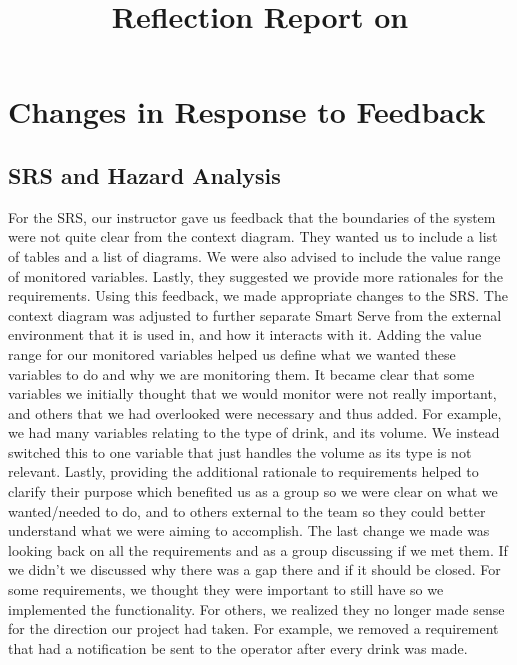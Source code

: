 \documentclass{article}
\title{Reflection Report on \progname}
\author{\authname}
\date{}
\begin{document}
\maketitle

\section{Changes in Response to Feedback}



\subsection{SRS and Hazard Analysis}
For the SRS, our instructor gave us feedback that the boundaries of the system were not quite clear from the context diagram. They wanted us to include a list of tables and a list of diagrams. We were also advised to include the value range of monitored variables. Lastly, they suggested we provide more rationales for the requirements. Using this feedback, we made appropriate changes to the SRS. The context diagram was adjusted to further separate Smart Serve from the external environment that it is used in, and how it interacts with it. Adding the value range for our monitored variables helped us define what we wanted these variables to do and why we are monitoring them. It became clear that some variables we initially thought that we would monitor were not really important, and others that we had overlooked were necessary and thus added. For example, we had many variables relating to the type of drink, and its volume. We instead switched this to one variable that just handles the volume as its type is not relevant. Lastly, providing the additional rationale to requirements helped to clarify their purpose which benefited us as a group so we were clear on what we wanted/needed to do, and to others external to the team so they could better understand what we were aiming to accomplish. The last change we made was looking back on all the requirements and as a group discussing if we met them. If we didn't we discussed why there was a gap there and if it should be closed. For some requirements, we thought they were important to still have so we implemented the functionality. For others, we realized they no longer made sense for the direction our project had taken. For example, we removed a requirement that had a notification be sent to the operator after every drink was made.
\end{document}

